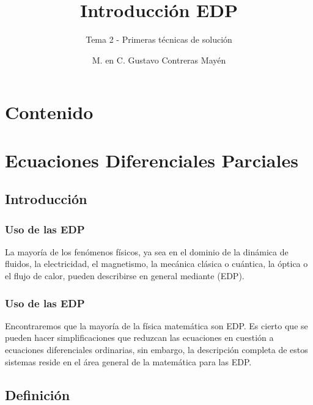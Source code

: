 \documentclass[12pt]{beamer}
\date{}
\title{\large{Introducción EDP }}
\subtitle{Tema 2 - Primeras técnicas de solución}
\author{M. en C. Gustavo Contreras Mayén}
\begin{document}
\maketitle
\fontsize{14}{14}\selectfont
{}

\section*{Contenido}

\section{Ecuaciones Diferenciales Parciales}
\subsection{Introducción}

\begin{frame}
\frametitle{Uso de las EDP}
La mayoría de los fenómenos físicos, ya sea en el dominio de la dinámica de fluidos, la electricidad, el magnetismo, la mecánica clásica o cuántica, la óptica o el flujo de calor, pueden describirse en general mediante  (EDP).
\end{frame}
\begin{frame}
\frametitle{Uso de las EDP}
Encontraremos que la mayoría de la física matemática son EDP. Es cierto que se pueden hacer simplificaciones que reduzcan las ecuaciones en cuestión a ecuaciones diferenciales ordinarias, sin embargo, la descripción completa de estos sistemas reside en el área general de la matemática para las EDP.
\end{frame}

\subsection{Definición}
\end{document}
